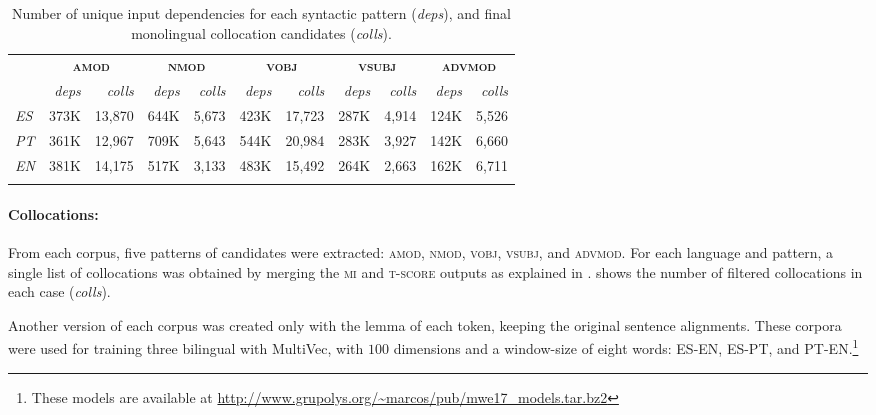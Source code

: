 \documentclass[output=paper
,modfonts
,nonflat]{langsci/langscibook}
\begin{document}
\begin{table}
  \begin{center}
    {\small{
        \caption{\label{tab:mono} Number of unique input dependencies for each syntactic pattern (\emph{deps}),
          and final monolingual collocation candidates (\emph{colls}).}
    \begin{tabular}{lrrrrrrrrrr}
      \lsptoprule
      \textbf{\multirow{2}{*}{Lg}} & \multicolumn{2}{c}{\textbf{\textsc{amod}}} & \multicolumn{2}{c}{\textbf{\textsc{nmod}}} & \multicolumn{2}{c}{\textbf{\textsc{vobj}}} & \multicolumn{2}{c}{\textbf{\textsc{vsubj}}} & \multicolumn{2}{c}{\textbf{\textsc{advmod}}} \\
      & \emph{deps} & \emph{colls} & \emph{deps} & \emph{colls} & \emph{deps} & \emph{colls} & \emph{deps} & \emph{colls} & \emph{deps} & \emph{colls}\\
      \midrule
      \emph{ES}   & 373K & 13,870   & 644K & 5,673   & 423K & 17,723 & 287K & 4,914 & 124K & 5,526 \\
      \emph{PT}   & 361K & 12,967   & 709K & 5,643   & 544K & 20,984 & 283K & 3,927 & 142K & 6,660 \\
      \emph{EN}   & 381K & 14,175   & 517K & 3,133   & 483K & 15,492 & 264K & 2,663 & 162K & 6,711 \\
      \lspbottomrule
    \end{tabular}
    }}
  \end{center}
\end{table}

\paragraph*{Collocations:} From each corpus, five patterns of  candidates
were extracted: \textsc{amod}, \textsc{nmod}, \textsc{vobj}, \textsc{vsubj}, and \textsc{advmod}.
For each language and pattern, a single list of collocations was obtained by merging the \textsc{mi}
and \textsc{t-score} outputs as explained in . 
shows the number of filtered collocations in each case (\emph{colls}).

Another version of each corpus was created only with the lemma of each token,
keeping the original sentence alignments. These corpora were used for training
three bilingual  with MultiVec, with $100$ dimensions and
a window-size of eight words: ES-EN, ES-PT, and PT-EN.\footnote{These models are available at \scriptsize{\url{http://www.grupolys.org/~marcos/pub/mwe17_models.tar.bz2}}}
\end{document}
